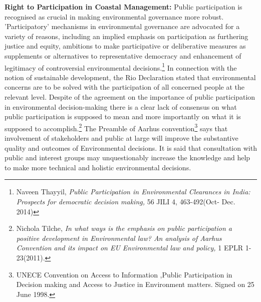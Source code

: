 \begin{multicols}{2}
\noi
{\large\bfseries Right to Participation in Coastal Management:} Public participation is
recognised as crucial in making environmental governance more robust. 'Participatory'
mechanisms in environmental governance are advocated for a variety of reasons, including an
implied emphasis on participation as furthering justice and equity, ambitions to make
participative or deliberative measures as supplements or alternatives to representative
democracy and enhancement of legitimacy of controversial environmental decisions.\footnote{Naveen Thayyil, \textit{Public Participation in Environmental Clearances in India: Prospects for democratic
decision making,} 56 JILI 4, 463-492(Oct- Dec. 2014)} In
connection with the notion of sustainable development, the Rio Declaration stated that
environmental concerns are to be solved with the participation of all concerned people at the
relevant level. Despite of the agreement on the importance of public participation in
environmental decision-making there is a clear lack of consensus on what public participation
is supposed to mean and more importantly on what it is supposed to accomplish.\footnote{Nichola Tilche, \textit{In what ways is the emphasis on public participation a positive development in Environmental law? An analysis of Aarhus Convention and its impact on EU Environmental law and policy,} 1 EPLR 1-
23(2011).} The
Preamble of Aarhus convention\footnote{UNECE Convention on Access to Information ,Public Participation in Decision making and Access to Justice
in Environment matters. Signed on 25 June 1998.} says that involvement of stakeholders and public at large
will improve the substantive quality and outcomes of Environmental decisions. It is said that
consultation with public and interest groups may unquestionably increase the knowledge and
help to make more technical and holistic environmental decisions.


\end{multicols}
